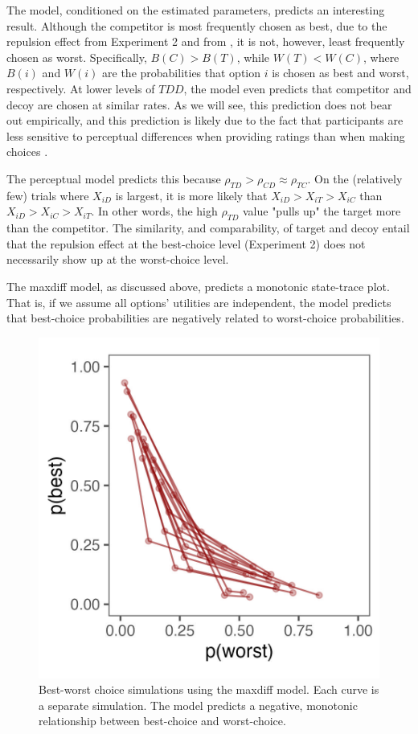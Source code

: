 The model, conditioned on the estimated parameters, predicts an interesting result. Although the competitor is most frequently chosen as best, due to the repulsion effect from Experiment 2 and from \textcite{spektorWhenGoodLooks2018b}, it is not, however, least frequently chosen as worst. Specifically, $B(C)>B(T)$, while $W(T)<W(C)$, where $B(i)$ and $W(i)$ are the probabilities that option $i$ is chosen as best and worst, respectively. At lower levels of $TDD$, the model even predicts that competitor and decoy are chosen at similar rates. As we will see, this prediction does not bear out empirically, and this prediction is likely due to the fact that participants are less sensitive to perceptual differences when providing ratings than when making choices \parencite{gronau2023choice}.

The perceptual model predicts this because $\rho_{TD}>\rho_{CD}\approx\rho_{TC}$. On the (relatively few) trials where $X_{iD}$ is largest, it is more likely that $X_{iD}>X_{iT}>X_{iC}$ than $X_{iD}>X_{iC}>X_{iT}$. In other words, the high $\rho_{TD}$ value "pulls up" the target more than the competitor. The similarity, and comparability, of target and decoy entail that the repulsion effect at the best-choice level (Experiment 2) does not necessarily show up at the worst-choice level.

The maxdiff model, as discussed above, predicts a monotonic state-trace plot. That is, if we assume all options' utilities are independent, the model predicts that best-choice probabilities are negatively related to worst-choice probabilities. 

\begin{figure}
   \includegraphics[width=\linewidth]{figures/maxdiff_sim_monotonic.jpeg}
   \caption{Best-worst choice simulations using the maxdiff model. Each curve is a separate simulation. The model predicts a negative, monotonic relationship between best-choice and worst-choice.}
   \label{fig:maxdiff_sim}
\end{figure}

